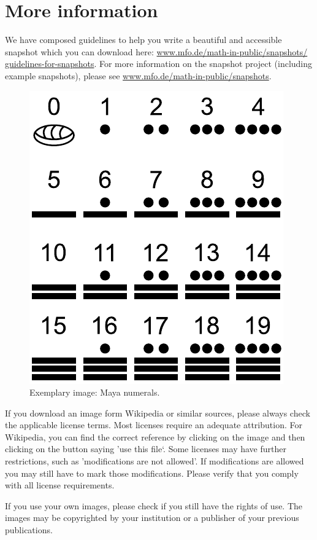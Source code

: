 \documentclass{snapshotmfo}
\begin{document}
\section{More information}
We have composed guidelines to help you write a beautiful and accessible snapshot which you can download here: \href{http://www.mfo.de/math-in-public/snapshots/guidelines-for-snapshots}{www.mfo.de/math-in-public/snapshots/ guidelines-for-snapshots}. For more information on the snapshot project (including example snapshots), please see \href{http://www.mfo.de/math-in-public/snapshots}{www.mfo.de/math-in-public/snapshots}.

\begin{figure}[h]
        \centering 
        \includegraphics[width= 0.33 \textwidth]{maya.pdf}
        \caption{Exemplary image: Maya numerals.}
\label{fig:maya}
\end{figure}

If you download an image form Wikipedia or similar sources, please always check the applicable license terms. Most licenses require an adequate attribution. For Wikipedia, you can find the correct reference by clicking on the image and then clicking on the button saying 'use this file‘. Some licenses may have further restrictions, such as 'modifications are not allowed'. If modifications are allowed you may still have to mark those modifications. Please verify that you comply with all license requirements.

If you use your own images, please check if you still have the rights of use. The images may be copyrighted by your institution or a publisher of your previous publications.
\clearpage
\end{document}
